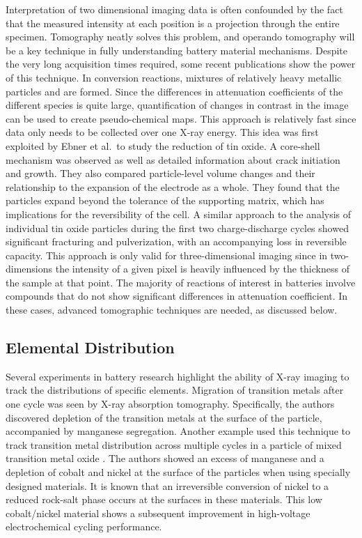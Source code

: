 \documentclass[journal=cmatex,manuscript=perspective]{achemso}
\begin{document}
Interpretation of two dimensional imaging data is often confounded by
the fact that the measured intensity at each position is a projection
through the entire specimen. Tomography neatly solves this problem,
and operando tomography will be a key technique in fully understanding
battery material mechanisms. Despite the very long acquisition times
required, some recent publications show the power of this
technique. In conversion reactions, mixtures of relatively heavy
metallic particles and  are formed\cite{cabana2010-2}. Since
the differences in attenuation coefficients of the different species
is quite large, quantification of changes in contrast in the image can
be used to create pseudo-chemical maps. This approach is relatively
fast since data only needs to be collected over one X-ray energy. This
idea was first exploited by Ebner et al.\ to study the reduction of
tin oxide. A core-shell mechanism was observed as well as detailed
information about crack initiation and growth. They also compared
particle-level volume changes and their relationship to the expansion
of the electrode as a whole. They found that the particles expand
beyond the tolerance of the supporting matrix, which has implications
for the reversibility of the cell\cite{ebner2013}. A similar approach
to the analysis of individual tin oxide particles during the first two
charge-discharge cycles showed significant fracturing and
pulverization, with an accompanying loss in reversible
capacity\cite{wang2014-2}. This approach is only valid for
three-dimensional imaging since in two-dimensions the intensity of a
given pixel is heavily influenced by the thickness of the sample at
that point. The majority of reactions of interest in batteries involve
compounds that do not show significant differences in attenuation
coefficient. In these cases, advanced tomographic techniques are
needed, as discussed below.


\subsection{Elemental Distribution}
Several experiments in battery research highlight the ability of X-ray
imaging to track the distributions of specific elements. Migration of
transition metals after one cycle was seen by X-ray absorption
tomography\cite{yang2014-2}. Specifically, the authors discovered
depletion of the transition metals at the surface of the particle,
accompanied by manganese segregation. Another example used this
technique to track transition metal distribution across multiple
cycles in a particle of mixed transition metal
oxide \cite{lin2016}. The authors showed an
excess of manganese and a depletion of cobalt and nickel at the
surface of the particles when using specially designed materials. It
is known that an irreversible conversion of nickel to a reduced
rock-salt phase occurs at the surfaces in these materials. This low
cobalt/nickel material shows a subsequent improvement in high-voltage
electrochemical cycling performance.
\end{document}
